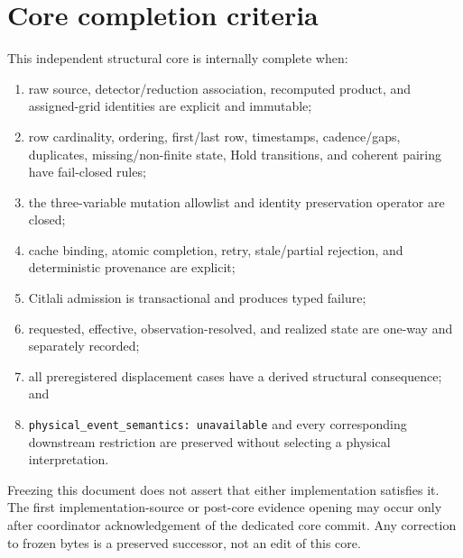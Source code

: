 \documentclass[11pt]{article}
\newcommand{\code}[1]{\texttt{#1}}
\newcommand{\typedunavailable}{\code{physical\_event\_semantics:}\allowbreak\ \code{unavailable}}
\begin{document}
\section{Core completion criteria}

This independent structural core is internally complete when:

\begin{enumerate}
\item raw source, detector/reduction association, recomputed product, and
  assigned-grid identities are explicit and immutable;
\item row cardinality, ordering, first/last row, timestamps, cadence/gaps,
  duplicates, missing/non-finite state, Hold transitions, and coherent pairing
  have fail-closed rules;
\item the three-variable mutation allowlist and identity preservation operator
  are closed;
\item cache binding, atomic completion, retry, stale/partial rejection, and
  deterministic provenance are explicit;
\item Citlali admission is transactional and produces typed failure;
\item requested, effective, observation-resolved, and realized state are
  one-way and separately recorded;
\item all preregistered displacement cases have a derived structural
  consequence; and
\item \typedunavailable{} and every corresponding downstream restriction are
  preserved without selecting a physical interpretation.
\end{enumerate}

Freezing this document does not assert that either implementation satisfies
it.  The first implementation-source or post-core evidence opening may occur
only after coordinator acknowledgement of the dedicated core commit.  Any
correction to frozen bytes is a preserved successor, not an edit of this core.
\end{document}
